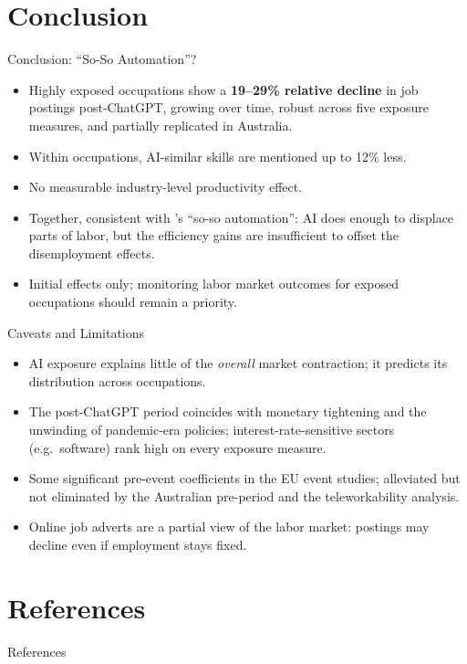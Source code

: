 \documentclass{beamer}
\begin{document}
\section{Conclusion}
\begin{frame}{Conclusion: ``So-So Automation''?}
\begin{itemize}
    \item Highly exposed occupations show a \textbf{19--29\% relative decline} in job postings post-ChatGPT, growing over time, robust across five exposure measures, and partially replicated in Australia.
    \item Within occupations, AI-similar skills are mentioned up to 12\% less.
    \item No measurable industry-level productivity effect.
    \item Together, consistent with \citet{acemoglu_automation_2019}'s ``so-so automation'': AI does enough to displace parts of labor, but the efficiency gains are insufficient to offset the disemployment effects.
    \item Initial effects only; monitoring labor market outcomes for exposed occupations should remain a priority.
\end{itemize}
\end{frame}

\begin{frame}{Caveats and Limitations}
\begin{itemize}
    \item AI exposure explains little of the \emph{overall} market contraction; it predicts its distribution across occupations.
    \item The post-ChatGPT period coincides with monetary tightening and the unwinding of pandemic-era policies; interest-rate-sensitive sectors (e.g.\ software) rank high on every exposure measure.
    \item Some significant pre-event coefficients in the EU event studies; alleviated but not eliminated by the Australian pre-period and the teleworkability analysis.
    \item Online job adverts are a partial view of the labor market: postings may decline even if employment stays fixed.
\end{itemize}
\end{frame}

\section{References}
\begin{frame}[allowframebreaks]{References}
\tiny


\end{frame}
\end{document}
